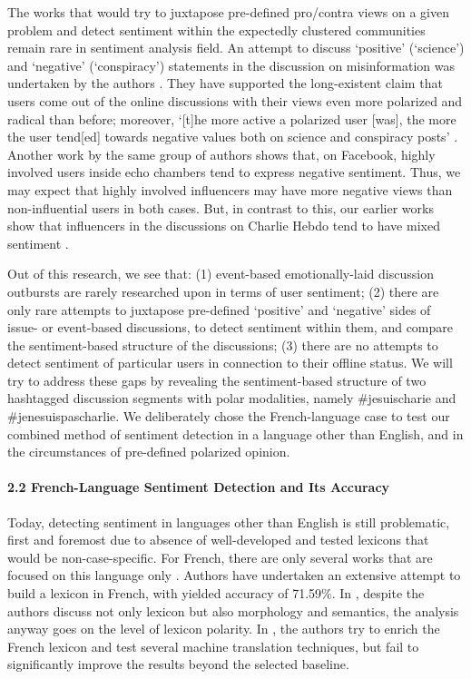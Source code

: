 The works that would try to juxtapose pre-defined pro/contra views on a given problem and detect sentiment within the expectedly clustered communities remain rare in sentiment analysis field. An attempt to discuss ‘positive’ (‘science’) and ‘negative’ (‘conspiracy’) statements in the discussion on misinformation was undertaken by the authors \cite{QuattrociocchiScalaSunstein,ZolloNovakDelVicario}. They have supported the long-existent claim that users come out of the online discussions with their views even more polarized and radical than before; moreover, ‘[t]he more active a polarized user [was], the more the user tend[ed] towards negative values both on science and conspiracy posts’ \cite[p.~12]{QuattrociocchiScalaSunstein}. Another work by the same group of authors \cite{DelVicarioVivaldoZollo} shows that, on Facebook, highly involved users inside echo chambers tend to express negative sentiment. Thus, we may expect that highly involved influencers may have more negative views than non-influential users in both cases. But, in contrast to this, our earlier works show that influencers in the discussions on Charlie Hebdo tend to have mixed sentiment \cite{BodrunovaBlekanovKukarkinCH}.

Out of this research, we see that: (1) event-based emotionally-laid discussion outbursts are rarely researched upon in terms of user sentiment; (2) there are only rare attempts to juxtapose pre-defined ‘positive’ and ‘negative’ sides of issue- or event-based discussions, to detect sentiment within them, and compare the sentiment-based structure of the discussions; (3) there are no attempts to detect sentiment of particular users in connection to their offline status. We will try to address these gaps by revealing the sentiment-based structure of two hashtagged discussion segments with polar modalities, namely \#jesuischarie and \#jenesuispascharlie. We deliberately chose the French-language case to test our combined method of sentiment detection in a language other than English, and in the circumstances of pre-defined polarized opinion.

\paragraph{2.2 French-Language Sentiment Detection and Its Accuracy} Today, detecting sentiment in languages other than English is still problematic, first and foremost due to absence of well-developed and tested lexicons that would be non-case-specific. For French, there are only several works that are focused on this language only \cite{Mathieu,GhorbelJacot,Ghorbel,PakParoubek}. Authors \cite{PakParoubek} have undertaken an extensive attempt to build a lexicon in French, with yielded accuracy of 71.59\%. In \cite{GhorbelJacot}, despite the authors discuss not only lexicon but also morphology and semantics, the analysis anyway goes on the level of lexicon polarity. In \cite{Ghorbel}, the authors try to enrich the French lexicon and test several machine translation techniques, but fail to significantly improve the results beyond the selected baseline.


